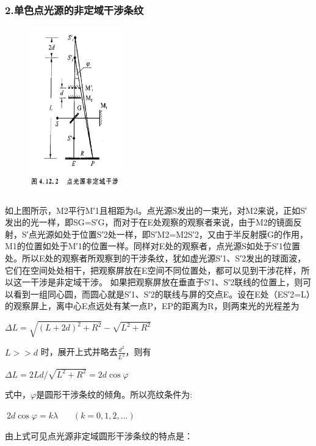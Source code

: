 \documentclass[11pt,a4paper,oneside]{article}
\begin{document}
\subsubsection*{2.单色点光源的非定域干涉条纹}
\begin{figure}[htbp]
 \centering
  \includegraphics[width=4cm]{Image/点光源非定域干涉.png}
\end{figure}
如上图所示，M2平行M′1且相距为d。点光源S发出的一束光，对M2来说，正如S′发出的光一样，即SG=S′G，而对于在E处观察的观察者来说，由于M2的镜面反射，S′点光源如处于位置S′2处一样，即S′M2=M2S′2，又由于半反射膜G的作用，M1的位置如处于M′1的位置一样。同样对E处的观察者，点光源S如处于S′1位置处。所以E处的观察者所观察到的干涉条纹，犹如虚光源S′1、S′2发出的球面波，它们在空间处处相干，把观察屏放在E空间不同位置处，都可以见到干涉花样，所以这一干涉是非定域干涉。
如果把观察屏放在垂直于S′1、S′2联线的位置上，则可以看到一组同心圆，而圆心就是S′1、S′2的联线与屏的交点E。设在E处（ES′2=L）的观察屏上，离中心E点远处有某一点P，EP的距离为R，则两束光的光程差为
\begin{center}
$\displaystyle\Delta L = \sqrt{\left ( L + 2d \right )^{2}+ R^{2}} - \sqrt{L^{2} + R^{2}}$
\end{center}
$L >> d$ 时，展开上式并略去$\displaystyle\frac{d^{2}}{L^{2}}$，则有
\begin{center}
$\displaystyle\Delta L = 2Ld / \sqrt{L^{2} + R^{2}} = 2d\cos \varphi $
\end{center}
式中，$\varphi$是圆形干涉条纹的倾角。所以亮纹条件为:
\begin{center}
$\displaystyle\ 2d\cos \varphi  = k\lambda  \ \ \ \ \ \ \ \ (k = 0,1,2,...)$
\end{center}
由上式可见点光源非定域圆形干涉条纹的特点是：
\end{document}
